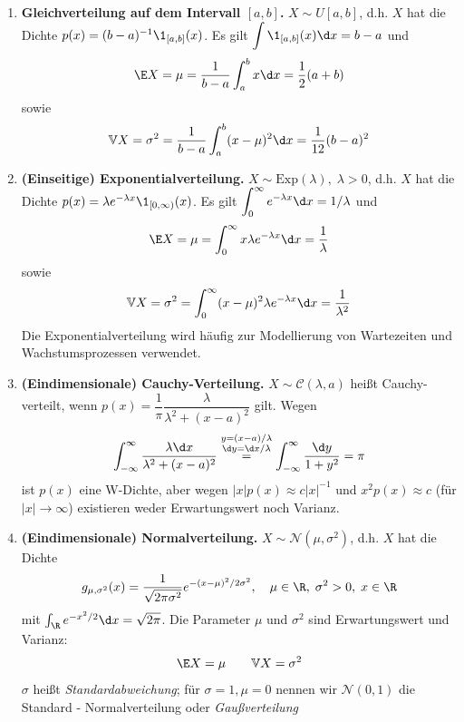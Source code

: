 \documentclass[11pt, a4paper]{article}
\begin{document}
\begin{example} \Theorem \mbox{}  \newline
    \begin{enumerate}[label=\alph*)]
        \item \textbf{Gleichverteilung auf dem Intervall $[a,b]$.} $X \sim U[a,b]$, d.h. $X$ hat die Dichte $p(x) = (b-a)^{-1}\1_{[a,b]}(x)$. Es gilt $\displaystyle\int \1_{[a,b]}(x)\d x = b-a$ und 
        $$\E X = \mu = \frac{1}{b-a}\int_a^b x \d x = \frac{1}{2}(a+b)$$ sowie $$ \mathbb{V}X = \sigma^2 = \frac{1}{b-a}\int_a^b (x-\mu)^2 \d x = \frac{1}{12}(b-a)^2$$
        \item \textbf{(Einseitige) Exponentialverteilung.} $X \sim \mathrm{Exp}(\lambda), \; \lambda > 0$, d.h. $X$ hat die Dichte $p(x) = \lambda e^{-\lambda x}\1_{[0,\infty)}(x)$. Es gilt $\displaystyle\int_0^\infty e^{-\lambda x}\d x = 1/\lambda$ und
        $$\E X = \mu = \int_0^\infty x\lambda e^{-\lambda x}\d x = \frac{1}{\lambda}$$
        sowie
        $$\mathbb{V}X = \sigma^2 = \int_0^\infty (x-\mu)^2 \lambda e^{-\lambda x}\d x = \frac{1}{\lambda^2}$$
        Die Exponentialverteilung wird häufig zur Modellierung von Wartezeiten und Wachstumsprozessen verwendet.

        \item \textbf{(Eindimensionale) Cauchy-Verteilung.} $X \sim \mathcal C(\lambda, a)$ heißt Cauchy-verteilt, wenn $p(x) = \dfrac{1}{\pi}\dfrac{\lambda}{\lambda^2+(x-a)^2}$ gilt. Wegen
        $$\int_{-\infty}^\infty \frac{\lambda \d x}{\lambda^2+(x-a)^2} \overset{\substack{y=(x-a)/\lambda \\ \d y = \d x/\lambda}}{=} \int_{-\infty}^\infty \frac{\d y}{1+y^2} = \pi$$
        ist $p(x)$ eine W-Dichte, aber wegen $|x|p(x) \approx c|x|^{-1}$ und $x^2 p(x) \approx c$ (für $|x|\to\infty$) existieren weder Erwartungswert noch Varianz.

        \item \textbf{(Eindimensionale) Normalverteilung.} $X \sim \mathcal N(\mu, \sigma^2)$, d.h. $X$ hat die Dichte
        $$g_{\mu,\sigma^2}(x) = \frac{1}{\sqrt{2\pi\sigma^2}} e^{-(x-\mu)^2/2\sigma^2}, \quad \mu \in \R, \; \sigma^2 > 0, \; x \in \R$$
        mit $\int_\R e^{-x^2/2}\d x = \sqrt{2\pi}$. Die Parameter $\mu$ und $\sigma^2$ sind Erwartungswert und Varianz:
        $$\E X = \mu \qquad \mathbb{V}X = \sigma^2$$
        $\sigma$ heißt \emph{Standardabweichung}; für $\sigma=1, \mu = 0$ nennen wir $\mathcal N (0,1)$ die Standard - Normalverteilung oder \emph{Gaußverteilung}

\end{enumerate}
\end{example}
\end{document}
